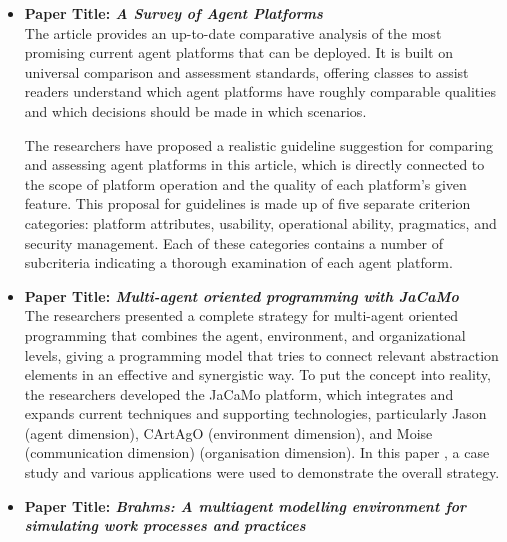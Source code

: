 \begin{itemize}[label={}]
\vspace{.5cm}

\item \textbf{Paper Title: \textit{A Survey of Agent Platforms}}\\

The article \cite{survey} provides an up-to-date comparative analysis of the most promising current agent platforms that can be deployed. It is built on universal comparison and assessment standards, offering classes to assist readers understand which agent platforms have roughly comparable qualities and which decisions should be made in which scenarios.

\vspace{.5cm}

The researchers have proposed a realistic guideline suggestion for comparing and assessing agent platforms in this article, which is directly connected to the scope of platform operation and the quality of each platform's given feature. This proposal for guidelines is made up of five separate criterion categories: platform attributes, usability, operational ability, pragmatics, and security management. Each of these categories contains a number of subcriteria indicating a thorough examination of each agent platform.

\vspace{.5cm}

\item \textbf{Paper Title: \textit{Multi-agent oriented programming with JaCaMo}}\\

The researchers presented a complete strategy for multi-agent oriented programming that combines the agent, environment, and organizational levels, giving a programming model that tries to connect relevant abstraction elements in an effective and synergistic way. To put the concept into reality, the researchers developed the JaCaMo platform, which integrates and expands current techniques and supporting technologies, particularly Jason (agent dimension), CArtAgO (environment dimension), and Moise (communication dimension) (organisation dimension).  In this paper \cite{Jacamo}, a case study and various applications were used to demonstrate the overall strategy.

\vspace{.5cm}

\item \textbf{Paper Title: \textit{Brahms: A multiagent modelling environment for simulating work processes and practices}}\\


\end{itemize}
